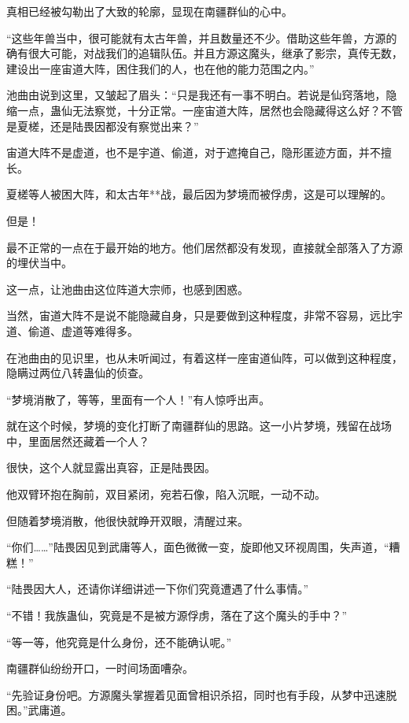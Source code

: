 
\begin{this_body}

真相已经被勾勒出了大致的轮廓，显现在南疆群仙的心中。

“这些年兽当中，很可能就有太古年兽，并且数量还不少。借助这些年兽，方源的确有很大可能，对战我们的追辑队伍。并且方源这魔头，继承了影宗，真传无数，建设出一座宙道大阵，困住我们的人，也在他的能力范围之内。”

池曲由说到这里，又皱起了眉头：“只是我还有一事不明白。若说是仙窍落地，隐缩一点，蛊仙无法察觉，十分正常。一座宙道大阵，居然也会隐藏得这么好？不管是夏槎，还是陆畏因都没有察觉出来？”

宙道大阵不是虚道，也不是宇道、偷道，对于遮掩自己，隐形匿迹方面，并不擅长。

夏槎等人被困大阵，和太古年**战，最后因为梦境而被俘虏，这是可以理解的。

但是！

最不正常的一点在于最开始的地方。他们居然都没有发现，直接就全部落入了方源的埋伏当中。

这一点，让池曲由这位阵道大宗师，也感到困惑。

当然，宙道大阵不是说不能隐藏自身，只是要做到这种程度，非常不容易，远比宇道、偷道、虚道等难得多。

在池曲由的见识里，也从未听闻过，有着这样一座宙道仙阵，可以做到这种程度，隐瞒过两位八转蛊仙的侦查。

“梦境消散了，等等，里面有一个人！”有人惊呼出声。

就在这个时候，梦境的变化打断了南疆群仙的思路。这一小片梦境，残留在战场中，里面居然还藏着一个人？

很快，这个人就显露出真容，正是陆畏因。

他双臂环抱在胸前，双目紧闭，宛若石像，陷入沉眠，一动不动。

但随着梦境消散，他很快就睁开双眼，清醒过来。

“你们……”陆畏因见到武庸等人，面色微微一变，旋即他又环视周围，失声道，“糟糕！”

“陆畏因大人，还请你详细讲述一下你们究竟遭遇了什么事情。”

“不错！我族蛊仙，究竟是不是被方源俘虏，落在了这个魔头的手中？”

“等一等，他究竟是什么身份，还不能确认呢。”

南疆群仙纷纷开口，一时间场面嘈杂。

“先验证身份吧。方源魔头掌握着见面曾相识杀招，同时也有手段，从梦中迅速脱困。”武庸道。


\end{this_body}
